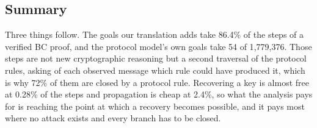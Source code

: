 \subsection{Summary}

Three things follow.
The goals our translation adds take 86.4\% of the steps of a verified BC proof, and the protocol
model's own goals take 54 of 1{,}779{,}376.
Those steps are not new cryptographic reasoning but a second traversal of the protocol rules,
asking of each observed message which rule could have produced it, which is why 72\% of them are
closed by a protocol rule.
Recovering a key is almost free at 0.28\% of the steps and propagation is cheap at 2.4\%, so what
the analysis pays for is reaching the point at which a recovery becomes possible, and it pays most
where no attack exists and every branch has to be closed.
